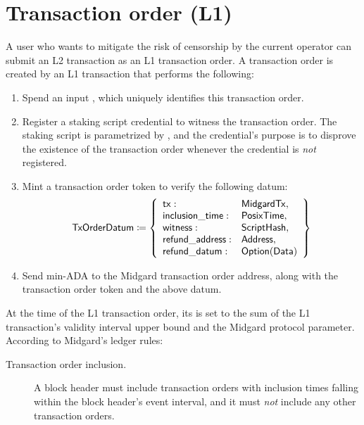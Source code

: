 \documentclass[../midgard.tex]{subfiles}
\begin{document}
\section{Transaction order (L1)}
\label{h:transaction-order}

A user who wants to mitigate the risk of censorship by the current operator can submit an L2 transaction as an L1 transaction order. A transaction order is created by an L1 transaction that performs the following:
\begin{enumerate}
    \item Spend an input , which uniquely identifies this transaction order.
    \item Register a staking script credential to witness the transaction order. The staking script is parametrized by , and the credential's purpose is to disprove the existence of the transaction order whenever the credential is \emph{not} registered.
    \item Mint a transaction order token to verify the following datum:
        \begin{equation*}
        \mathsf{TxOrderDatum} \coloneq \left\{
            \begin{array}{ll}
                \mathsf{tx} : & \mathsf{MidgardTx}, \\
                \mathsf{inclusion\_time} : & \mathsf{PosixTime}, \\
                \mathsf{witness} : & \mathsf{ScriptHash}, \\
                \mathsf{refund\_address}: & \mathsf{Address}, \\
                \mathsf{refund\_datum}: & \mathsf{Option(Data)}
            \end{array}
            \right\}
        \end{equation*}
    \item Send min-ADA to the Midgard transaction order address, along with the transaction order token and the above datum.
\end{enumerate}

At the time of the L1 transaction order, its  is set to the sum of the L1 transaction's validity interval upper bound and the  Midgard protocol parameter. According to Midgard's ledger rules:
\begin{description}
    \item[Transaction order inclusion.] A block header must include transaction orders with inclusion times falling within the block header's event interval, and it must \emph{not} include any other transaction orders.
\end{description}
\end{document}
